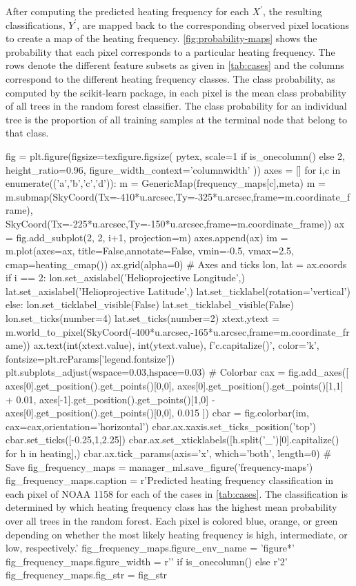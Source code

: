 After computing the predicted heating frequency for each $X^\prime$, the resulting classifications, $Y^\prime$, are mapped back to the corresponding observed pixel locations to create a map of the heating frequency. \autoref{fig:probability-maps} shows the probability that each pixel corresponds to a particular heating frequency. The rows denote the different feature subsets as given in \autoref{tab:cases} and the columns correspond to the different heating frequency classes. The class probability, as computed by the scikit-learn package, in each pixel is the mean class probability of all trees in the random forest classifier. The class probability for an individual tree is the proportion of all training samples at the terminal node that belong to that class.

\begin{pycode}[manager_ml]
fig = plt.figure(figsize=texfigure.figsize(
    pytex,
    scale=1 if is_onecolumn() else 2,
    height_ratio=0.96,
    figure_width_context='columnwidth'
))
axes = []
for i,c in enumerate(('a','b','c','d')):
    m = GenericMap(frequency_maps[c],meta)
    m = m.submap(SkyCoord(Tx=-410*u.arcsec,Ty=-325*u.arcsec,frame=m.coordinate_frame),
                 SkyCoord(Tx=-225*u.arcsec,Ty=-150*u.arcsec,frame=m.coordinate_frame))
    ax = fig.add_subplot(2, 2, i+1, projection=m)
    axes.append(ax)
    im = m.plot(axes=ax, title=False,annotate=False, vmin=-0.5, vmax=2.5, cmap=heating_cmap())
    ax.grid(alpha=0)
    # Axes and ticks
    lon, lat = ax.coords
    if i == 2:
        lon.set_axislabel('Helioprojective Longitude',)
        lat.set_axislabel('Helioprojective Latitude',)
        lat.set_ticklabel(rotation='vertical')
    else:
        lon.set_ticklabel_visible(False)
        lat.set_ticklabel_visible(False)
    lon.set_ticks(number=4)
    lat.set_ticks(number=2)
    xtext,ytext = m.world_to_pixel(SkyCoord(-400*u.arcsec,-165*u.arcsec,frame=m.coordinate_frame))
    ax.text(int(xtext.value), int(ytext.value), f'{c.capitalize()}', color='k', fontsize=plt.rcParams['legend.fontsize'])
plt.subplots_adjust(wspace=0.03,hspace=0.03)
# Colorbar
cax = fig.add_axes([
    axes[0].get_position().get_points()[0,0],
    axes[0].get_position().get_points()[1,1] + 0.01,
    axes[-1].get_position().get_points()[1,0] - axes[0].get_position().get_points()[0,0],
    0.015
])
cbar = fig.colorbar(im, cax=cax,orientation='horizontal')
cbar.ax.xaxis.set_ticks_position('top')
cbar.set_ticks([-0.25,1,2.25])
cbar.ax.set_xticklabels([h.split('_')[0].capitalize() for h in heating],)
cbar.ax.tick_params(axis='x', which='both', length=0)
# Save
fig_frequency_maps = manager_ml.save_figure('frequency-maps')
fig_frequency_maps.caption = r'Predicted heating frequency classification in each pixel of NOAA 1158 for each of the cases in \autoref{tab:cases}. The classification is determined by which heating frequency class has the highest mean probability over all trees in the random forest. Each pixel is colored blue, orange, or green depending on whether the most likely heating frequency is high, intermediate, or low, respectively.'
fig_frequency_maps.figure_env_name = 'figure*'
fig_frequency_maps.figure_width = r'\columnwidth' if is_onecolumn() else r'2\columnwidth'
fig_frequency_maps.fig_str = fig_str
\end{pycode}

